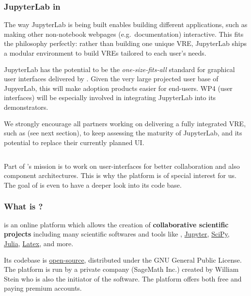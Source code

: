 \documentclass{deliverablereport}
\begin{document}
\subsubsection{JupyterLab in \ODK}

The way JupyterLab is being built enables building different
applications, such as making other non-notebook webpages (e.g.\
documentation) interactive. This fits the \ODK philosophy perfectly:
rather than building one unique VRE, JupyterLab ships a modular
environment to build VREs tailored to each user's needs.

JupyterLab has the potential to be the \emph{one-size-fits-all}
standard for graphical user interfaces delivered by \ODK. Given the
very large projected user base of JupyerLab, this will make adoption
\ODK products easier for end-users. WP4 (user interfaces) will be
especially involved in integrating JupyterLab into its demonstrators.

We strongly encourage all partners working on delivering a fully
integrated VRE, such as \SMC (see next section), to keep assessing the
maturity of JupyterLab, and its potential to replace their currently
planned UI.


\subsection{\SMC}
\label{sec:SMC}

Part of \ODK's mission is to work on user-interfaces for better
collaboration and also component architectures.  This is why the
\href{http://cloud.sagemath.com/}{\SMC} platform is of special
interest for us. The goal of
 is even to have a deeper
look into its code base.

\subsubsection{What is \SMC?}

\SMC is an online platform which allows the creation of
\textbf{collaborative scientific projects} including many scientific
softwares and tools like \href{http://www.sagemath.org/}{\Sage},
\href{http://jupyter.org/}{Jupyter},
\href{https://www.scipy.org/}{SciPy},
\href{http://julialang.org/}{Julia},
\href{https://fr.wikipedia.org/wiki/LaTeX}{Latex}, and more.

Its codebase is
\href{https://github.com/sagemathinc/smc}{open-source}, distributed
under the GNU General Public License. The platform is run by a private
company (SageMath Inc.) created by William Stein who is also the
initiator of the \Sage software. The platform offers both free and
paying premium accounts.
\end{document}
